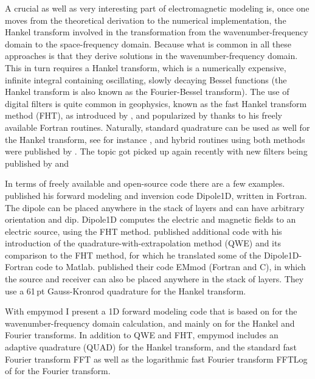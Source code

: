 \documentclass[manuscript,revised]{geophysics}
\begin{document}
A crucial as well as very interesting part of electromagnetic modeling is, once
one moves from the theoretical derivation to the numerical implementation, the
Hankel transform involved in the transformation from the
wave\-num\-ber-fre\-que\-ncy domain to the space-frequency domain. Because
what is common in all these approaches is that they derive solutions in the
wavenumber-frequency domain. This in turn requires a Hankel transform, which is
a numerically expensive, infinite integral containing oscillating, slowly
decaying Bessel functions (the Hankel transform is also known as the
Fourier-Bessel transform). The use of digital filters is quite common in
geophysics, known as the fast Hankel transform method (FHT), as introduced by
\cite{GP.71.Gosh}, and popularized by \cite{TRP.75.Anderson, GEO.79.Anderson,
TMS.82.Anderson} thanks to his freely available Fortran routines. Naturally,
standard quadrature can be used as well for the Hankel transform, see for
instance \cite{GEO.83.Chave}, and hybrid routines using both methods were
published by \cite{GEO.84.Anderson, GEO.89.Anderson}. The topic got picked up
again recently with new filters being published by \cite{GP.07.Kong} and
\cite{GEO.09.Key, GEO.12.Key}

In terms of freely available and open-source code there are a few examples.
\cite{GEO.09.Key} published his forward modeling and inversion code Dipole1D,
written in Fortran. The dipole can be placed anywhere in the stack of layers
and can have arbitrary orientation and dip. Dipole1D computes the electric and
magnetic fields to an electric source, using the FHT method. \cite{GEO.12.Key}
published additional code with his introduction of the
qua\-dra\-ture-with-ex\-tra\-po\-la\-tion method (QWE) and its comparison to
the FHT method, for which he translated some of the Dipole1D-Fortran code to
Matlab. \cite{GEO.15.Hunziker} published their code EMmod (Fortran and C), in
which the source and receiver can also be placed anywhere in the stack of
layers. They use a 61\,pt Gauss-Kronrod quadrature for the Hankel transform.

With empymod I present a 1D forward modeling code that is based on
\cite{GEO.15.Hunziker} for the wavenumber-frequency domain calculation, and
mainly on \cite{GEO.12.Key} for the Hankel and Fourier transforms. In addition
to QWE and FHT, empymod includes an adaptive quadrature (QUAD) for the Hankel
transform, and the standard fast Fourier transform FFT as well as the
logarithmic fast Fourier transform FFTLog of \cite{RAS.00.Hamilton} for the
Fourier transform.
\end{document}
